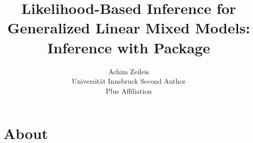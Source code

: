 \documentclass[article]{jss}
\author{Achim Zeileis\\Universit\"at Innsbruck \And 
        Second Author\\Plus Affiliation}
\title{ Likelihood-Based Inference for Generalized Linear Mixed Models: Inference with Package \pkg{glmm}}
\begin{document}

\section[About Java]{About }
\end{document}
